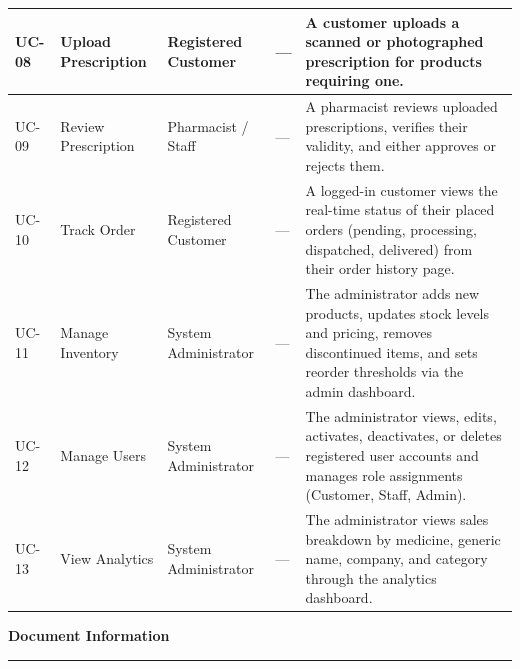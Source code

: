 \documentclass[12pt, a4paper]{article}
\begin{document}
\begin{longtable}{|C{0.8cm}|L{2.4cm}|L{3.0cm}|L{3.2cm}|L{5.8cm}|}
  \small UC-08 &
  \small Upload Prescription &
  \small Registered Customer &
  \small --- &
  \small A customer uploads a scanned or photographed prescription for products requiring one. \\
  \hline

  \small UC-09 &
  \small Review Prescription &
  \small Pharmacist / Staff &
  \small --- &
  \small A pharmacist reviews uploaded prescriptions, verifies their validity, and either approves or rejects them. \\
  \hline

  \small UC-10 &
  \small Track Order &
  \small Registered Customer &
  \small --- &
  \small A logged-in customer views the real-time status of their placed orders (pending, processing, dispatched, delivered) from their order history page. \\
  \hline

  \small UC-11 &
  \small Manage Inventory &
  \small System Administrator &
  \small --- &
  \small The administrator adds new products, updates stock levels and pricing, removes discontinued items, and sets reorder thresholds via the admin dashboard. \\
  \hline

  \small UC-12 &
  \small Manage Users &
  \small System Administrator &
  \small --- &
  \small The administrator views, edits, activates, deactivates, or deletes registered user accounts and manages role assignments (Customer, Staff, Admin). \\
  \hline

  \small UC-13 &
  \small View Analytics &
  \small System Administrator &
  \small --- &
  \small The administrator views sales breakdown by medicine, generic name, company, and category through the analytics dashboard. \\
  \hline

\end{longtable}

\newpage
{\color{pharmagreen}\large\bfseries Document Information}
\vspace{4pt}
\textcolor{pharmagreen}{\rule{\textwidth}{1pt}}
\vspace{8pt}
\end{document}
